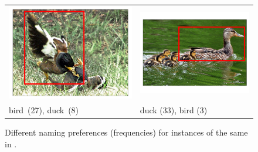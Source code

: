 \begin{figure}[t]
	\centering
	\small
	\begin{tabular}{p{3cm}p{3cm}}
		\centering
		\includegraphics[scale=0.15]{images/2327551_2960743_seed_ambiguous.png} &
		\includegraphics[scale=0.15]{images/2358126_805887_singleton_obj.png}\\
		bird\ (27),  duck\ (8) & duck (33), bird (3)\\
	\end{tabular}
	\caption{Different naming preferences (frequencies) for instances of the same \category {} in \mn.\label{fig:duck}}
\end{figure}

